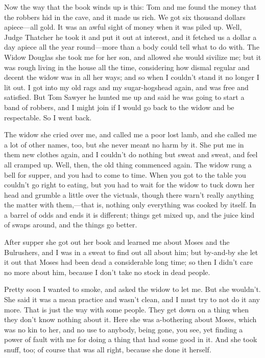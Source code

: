 \documentclass[10pt,a4paper]{article}
\begin{document}
Now the way that the book winds up is this: Tom and me found the money that the robbers hid in the cave, and it made us rich. We got six thousand dollars apiece—all gold. It was an awful sight of money when it was piled up. Well, Judge Thatcher he took it and put it out at interest, and it fetched us a dollar a day apiece all the year round—more than a body could tell what to do with. The Widow Douglas she took me for her son, and allowed she would sivilize me; but it was rough living in the house all the time, considering how dismal regular and decent the widow was in all her ways; and so when I couldn’t stand it no longer I lit out. I got into my old rags and my sugar-hogshead again, and was free and satisfied. But Tom Sawyer he hunted me up and said he was going to start a band of robbers, and I might join if I would go back to the widow and be respectable. So I went back.

The widow she cried over me, and called me a poor lost lamb, and she called me a lot of other names, too, but she never meant no harm by it. She put me in them new clothes again, and I couldn’t do nothing but sweat and sweat, and feel all cramped up. Well, then, the old thing commenced again. The widow rung a bell for supper, and you had to come to time. When you got to the table you couldn’t go right to eating, but you had to wait for the widow to tuck down her head and grumble a little over the victuals, though there warn’t really anything the matter with them,—that is, nothing only everything was cooked by itself. In a barrel of odds and ends it is different; things get mixed up, and the juice kind of swaps around, and the things go better.

After supper she got out her book and learned me about Moses and the Bulrushers, and I was in a sweat to find out all about him; but by-and-by she let it out that Moses had been dead a considerable long time; so then I didn’t care no more about him, because I don’t take no stock in dead people.

Pretty soon I wanted to smoke, and asked the widow to let me. But she wouldn’t. She said it was a mean practice and wasn’t clean, and I must try to not do it any more. That is just the way with some people. They get down on a thing when they don’t know nothing about it. Here she was a-bothering about Moses, which was no kin to her, and no use to anybody, being gone, you see, yet finding a power of fault with me for doing a thing that had some good in it. And she took snuff, too; of course that was all right, because she done it herself.
\end{document}
